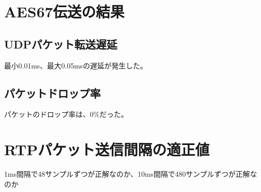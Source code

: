 \section{AES67伝送の結果}

\subsection{UDPパケット転送遅延}

最小0.01ms、最大0.05msの遅延が発生した。

\subsection{パケットドロップ率}

パケットのドロップ率は、0\%だった。

\section{RTPパケット送信間隔の適正値}

1ms間隔で48サンプルずつが正解なのか、10ms間隔で480サンプルずつが正解なのか
